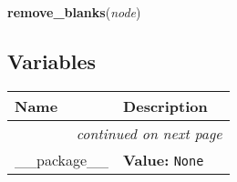     \label{QCG_script_generator:remove_blanks}

    \vspace{0.5ex}

\hspace{.8\funcindent}\begin{boxedminipage}{\funcwidth}

    \raggedright \textbf{remove\_blanks}(\textit{node})

\setlength{\parskip}{2ex}
\setlength{\parskip}{1ex}
    \end{boxedminipage}



  \subsection{Variables}

    \vspace{-1cm}
\hspace{\varindent}\begin{longtable}{|p{\varnamewidth}|p{\vardescrwidth}|l}
\cline{1-2}
\cline{1-2} \centering \textbf{Name} & \centering \textbf{Description}& \\
\cline{1-2}
\endhead\cline{1-2}\multicolumn{3}{r}{\small\textit{continued on next page}}\\\endfoot\cline{1-2}
\endlastfoot\raggedright \_\-\_\-p\-a\-c\-k\-a\-g\-e\-\_\-\_\- & \raggedright \textbf{Value:} 
{\tt None}&\\
\cline{1-2}
\end{longtable}

